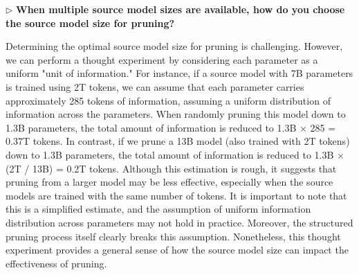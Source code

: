 $\triangleright$ \textbf{When multiple source model sizes are available, how do you choose the source model size for pruning?}

Determining the optimal source model size for pruning is challenging. However, we can perform a thought experiment by considering each parameter as a uniform "unit of information." For instance, if a source model with 7B parameters is trained using 2T tokens, we can assume that each parameter carries approximately 285 tokens of information, assuming a uniform distribution of information across the parameters. When randomly pruning this model down to 1.3B parameters, the total amount of information is reduced to 1.3B × 285 = 0.37T tokens. In contrast, if we prune a 13B model (also trained with 2T tokens) down to 1.3B parameters, the total amount of information is reduced to 1.3B × (2T / 13B) = 0.2T tokens. Although this estimation is rough, it suggests that pruning from a larger model may be less effective, especially when the source models are trained with the same number of tokens. It is important to note that this is a simplified estimate, and the assumption of uniform information distribution across parameters may not hold in practice. Moreover, the structured pruning process itself clearly breaks this assumption. Nonetheless, this thought experiment provides a general sense of how the source model size can impact the effectiveness of pruning.





